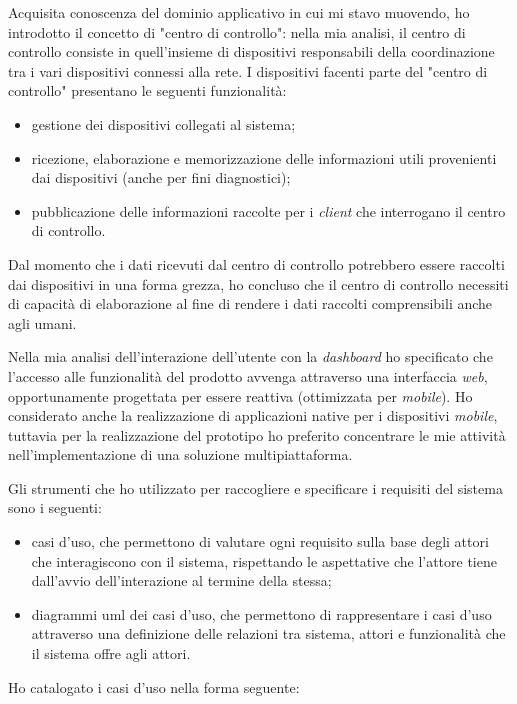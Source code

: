 Acquisita conoscenza del dominio applicativo in cui mi stavo muovendo, ho introdotto il concetto di "centro di controllo": nella mia analisi, il centro di controllo consiste in quell'insieme di dispositivi responsabili della coordinazione tra i vari dispositivi connessi alla rete.
I dispositivi facenti parte del "centro di controllo" presentano le seguenti funzionalità:
\begin{itemize}
	\item gestione dei dispositivi collegati al sistema;
	\item ricezione, elaborazione e memorizzazione delle informazioni utili provenienti dai dispositivi (anche per fini diagnostici);
	\item pubblicazione delle informazioni raccolte per i \emph{client} che interrogano il centro di controllo.
\end{itemize}
Dal momento che i dati ricevuti dal centro di controllo potrebbero essere raccolti dai dispositivi in una forma grezza, ho concluso che il centro di controllo necessiti di capacità di elaborazione al fine di rendere i dati raccolti comprensibili anche agli umani.





Nella mia analisi dell'interazione dell'utente con la \emph{dashboard} ho specificato che l'accesso alle funzionalità del prodotto avvenga attraverso una interfaccia \emph{web}, opportunamente progettata per essere reattiva (ottimizzata per \emph{mobile}). Ho considerato anche la realizzazione di applicazioni native per i dispositivi \emph{mobile}, tuttavia per la realizzazione del prototipo ho preferito concentrare le mie attività nell'implementazione di una soluzione multipiattaforma.


Gli strumenti che ho utilizzato per raccogliere e specificare i requisiti del sistema sono i seguenti:
\begin{itemize}
  \item casi d'uso, che permettono di valutare ogni requisito sulla base degli attori che interagiscono con il sistema, rispettando le aspettative che l'attore tiene dall'avvio dell'interazione al termine della stessa;
  \item diagrammi \gls{uml} dei casi d'uso, che permettono di rappresentare i casi d'uso attraverso una definizione delle relazioni tra sistema, attori e funzionalità che il sistema offre agli attori.
\end{itemize}
Ho catalogato i casi d’uso nella forma seguente:

